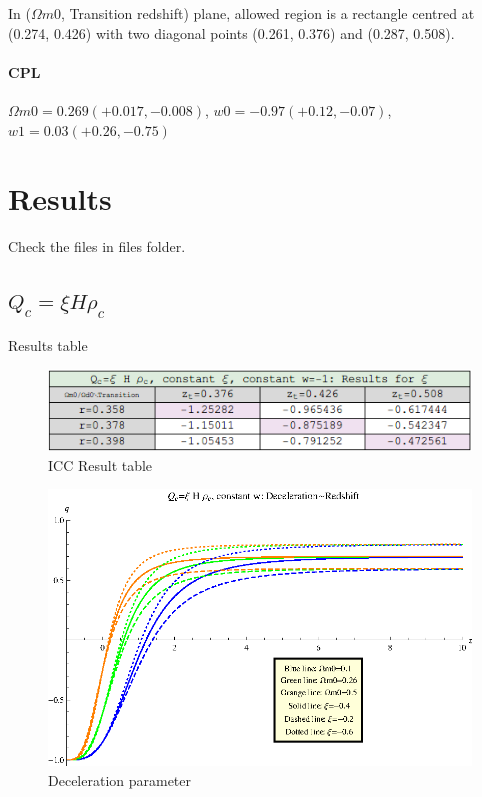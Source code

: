 \documentclass[12pt,a4paper]{article}
\begin{document}
In ($\Omega m0$, Transition redshift) plane, allowed region is a rectangle centred at (0.274, 0.426) with two diagonal points (0.261, 0.376) and (0.287, 0.508).


\paragraph{CPL}
$\Omega m0=0.269 (+0.017, -0.008)$, $w0 = -0.97 (+0.12, -0.07)$, $w1=0.03 (+0.26, -0.75)$



\section{Results}

Check the files in files folder.

\subsection{$Q_c=\xi H \rho_c$}


Results table

\begin{figure}[htpb]
\centering
\includegraphics[width=500pt]{rhoc_ICC_table1.png}
\caption{ICC Result table}
\end{figure}


\begin{figure}[htpb]
\centering
\includegraphics[width=500pt]{rhoc_DecelerationPara.eps}
\caption{Deceleration parameter}\label{fig-rhoc_DecPara}
\end{figure}
\end{document}
